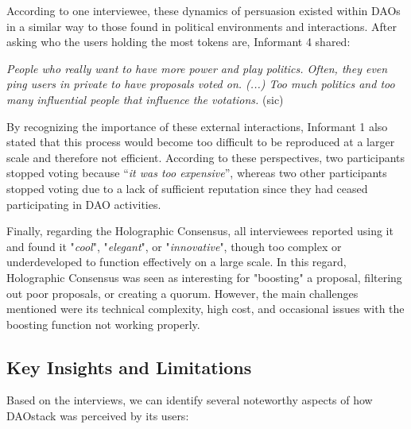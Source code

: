 \documentclass[10pt,lineno]{wlpeerj}
\begin{document}
According to one interviewee, these dynamics of persuasion existed within DAOs in a similar way to those found in political environments and interactions. After asking who the users holding the most tokens are, Informant 4 shared:

\begin{displayquote}[Informant 4]
\emph{People who really want to have more power and play politics. Often, they even ping users in private to have proposals voted on. (...) Too much politics and too many influential people that influence the votations.} (sic)
\end{displayquote}

By recognizing the importance of these external interactions, Informant 1 also stated that this process would become too difficult to be reproduced at a larger scale and therefore not efficient.
According to these perspectives, two participants stopped voting because ``\emph{it was too expensive}'', whereas two other participants stopped voting due to a lack of sufficient reputation since they had ceased participating in DAO activities.

Finally, regarding the Holographic Consensus, all interviewees reported using it and found it "\emph{cool}", "\emph{elegant}", or "\emph{innovative}", though too complex or underdeveloped to function effectively on a large scale. In this regard, Holographic Consensus was seen as interesting for "boosting" a proposal, filtering out poor proposals, or creating a quorum. However, the main challenges mentioned were its technical complexity, high cost, and occasional issues with the boosting function not working properly.

\subsection{Key Insights and Limitations}

Based on the interviews, we can identify several noteworthy aspects of how DAOstack was perceived by its users:
\end{document}
